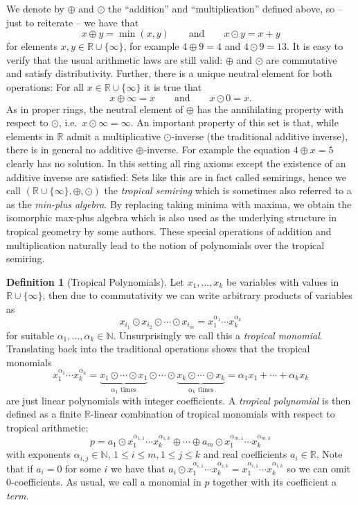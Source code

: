 \documentclass[
  paper=a4,
  titlepage,
  bibliography=totoc,
  listof=totoc,
  pagesize=pdftex
]{scrartcl}
\numberwithin{figure}{section}
\numberwithin{equation}{section}
\numberwithin{table}{section}
\newcommand*\setR{\mathds{R}}
\newcommand*\setN{\mathds{N}}
\theoremstyle{definition}
\newtheorem{definition}{Definition}
\numberwithin{definition}{section}
\begin{document}
We denote by $\oplus$ and $\odot$ the \enquote{addition} and \enquote{multiplication}
defined above, so -- just to reiterate -- we have that
\[
  x \oplus y = \min(x,y)
  \qquad \text{and} \qquad
  x \odot y = x+y
\]
for elements $x,y\in \setR\cup\{\infty\}$, for example $4\oplus9 = 4$ and $4\odot9 = 13$.
It is easy to verify that the usual arithmetic laws are still valid: $\oplus$ and $\odot$
are commutative and satisfy distributivity. Further, there is a unique neutral  element
for both operations: For all $x\in \setR\cup \{\infty\}$ it is true that
\[
  x \oplus \infty = x
  \qquad \text{and} \qquad
  x \odot 0 = x.
\]
As in proper rings, the neutral element of $\oplus$ has the annihilating property with
respect to $\odot$, i.e.\ $x\odot \infty = \infty$. An important property of this set is
that, while elements in $\setR$ admit a multiplicative $\odot$-inverse (the traditional
additive inverse), there is in general no additive $\oplus$-inverse. For example the
equation $4\oplus x = 5$ clearly has no solution. In this setting all ring axioms except
the existence of an additive inverse are satisfied: Sets like this are in fact called
semirings, hence we call $(\setR\cup \{\infty\}, \oplus, \odot)$ the \emph{tropical
semiring} which is sometimes also referred to a as the \emph{min-plus algebra}. By
replacing taking minima with maxima, we obtain the isomorphic max-plus algebra which is
also used as the underlying structure in tropical geometry by some authors. These special
operations of addition and multiplication naturally lead to the notion of polynomials over
the tropical semiring.

\begin{definition}[Tropical Polynomials]
  \label{def:tropPoly}
  Let $x_1, \dots, x_k$ be variables with values in $\setR\cup\{\infty\}$, then due to
  commutativity we can write arbitrary products of variables as
  \[
    x_{i_1} \odot x_{i_2} \odot \cdots \odot x_{i_m}
    = x_1^{\alpha_1} \cdots x_k^{\alpha_k}
  \]
  for suitable $\alpha_1, \dots, \alpha_k \in \setN$. Unsurprisingly we call this a
  \emph{tropical monomial}. Translating back into the traditional operations shows that
  the tropical monomials
  \[
    x_1^{\alpha_1} \cdots x_k^{\alpha_k} =
    \underbrace{x_1\odot\cdots\odot x_1}_{\alpha_1 \text{ times}}
    \odot\cdots\odot
    \underbrace{x_k\odot\cdots\odot x_k}_{\alpha_k \text{ times}}
    = \alpha_1x_1 + \cdots + \alpha_kx_k
  \]
  are just linear polynomials with integer coefficients. A \emph{tropical polynomial} is
  then defined as a finite $\setR$-linear combination of tropical monomials with respect
  to tropical arithmetic:
  \[
    p = a_1 \odot x_1^{\alpha_{1,1}}\cdots x_k^{\alpha_{1,k}} \oplus \cdots \oplus
    a_m \odot x_1^{\alpha_{m,1}}\cdots x_k^{\alpha_{m,k}}
  \]
  with exponents $\alpha_{i,j} \in \setN$, $1\leq i \leq m, 1\leq j \leq k$ and real
  coefficients $a_i \in \setR$. Note that if $a_i = 0$ for some $i$ we have that $a_i\odot
  x_1^{\alpha_{i,1}}\cdots x_k^{\alpha_{i,k}} = x_1^{\alpha_{i,1}}\cdots
  x_k^{\alpha_{i,k}}$ so we can omit $0$-coefficients. As usual, we call a monomial in $p$
  together with its coefficient a \emph{term}.
\end{definition}
\end{document}
